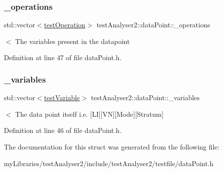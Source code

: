 \subsubsection{\texorpdfstring{\_operations}{\_operations}}
{\footnotesize\ttfamily std\+::vector$<$\mbox{\hyperlink{structtestAnalyser2_1_1testOperation}{test\+Operation}}$>$ test\+Analyser2\+::data\+Point\+::\+\_\+operations}

$<$ The variables present in the datapoint 

Definition at line 47 of file data\+Point.\+h.

\mbox{\label{structtestAnalyser2_1_1dataPoint_a4ca3ec50ceed09866220f0d18f5a822e}} 
\subsubsection{\texorpdfstring{\_variables}{\_variables}}
{\footnotesize\ttfamily std\+::vector$<$\mbox{\hyperlink{structtestAnalyser2_1_1testVariable}{test\+Variable}}$>$ test\+Analyser2\+::data\+Point\+::\+\_\+variables}

$<$ The data point itself i.\+e. \mbox{[}LI\mbox{]}\mbox{[}VN\mbox{]}\mbox{[}Mode\mbox{]}\mbox{[}Stratum\mbox{]} 

Definition at line 46 of file data\+Point.\+h.



The documentation for this struct was generated from the following file\+:\begin{DoxyCompactItemize}
\item 
my\+Libraries/test\+Analyser2/include/test\+Analyser2/testfile/data\+Point.\+h\end{DoxyCompactItemize}
